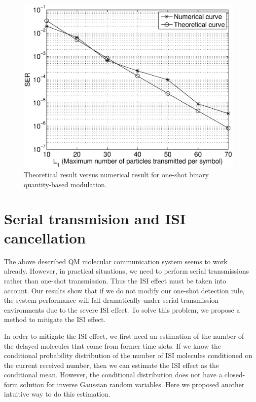 \begin{figure}[htb]
\centering
\includegraphics[width=5.5in, keepaspectratio]{QM/analysis_0329.eps}
\caption{Theoretical result versus numerical result for one-shot binary quantity-based modulation.} \label{fig:error_rate}
\end{figure}

\section{Serial transmision and ISI cancellation}
The above described QM molecular communication system seems to work already. However, in practical situations, we need to perform serial transmissions rather than one-shot transmission. Thus the ISI effect must be taken into account.
Our results show that if we do not modify our one-shot detection rule, the system performance will fall dramatically under serial transmission environments due to the severe ISI effect. To solve this problem, we propose a method to mitigate the ISI effect.

In order to mitigate the ISI effect, we first need an estimation of the number of the delayed molecules that come from former time slots. If we know the conditional probability distribution of the number of ISI molecules conditioned on the current received number, then we can estimate the ISI effect as the conditional mean.
However, the conditional distribution does not have a closed-form solution for inverse Gaussian random variables. Here we proposed another intuitive way to do this estimation.

